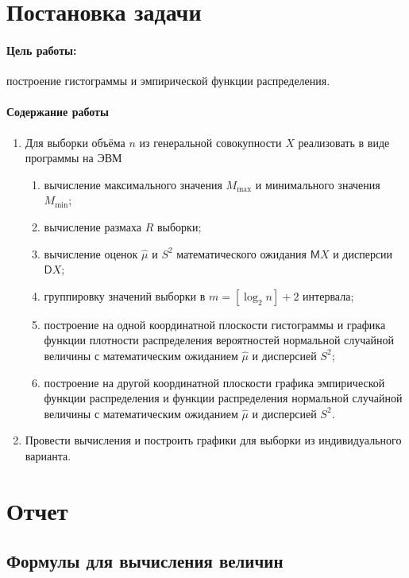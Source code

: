 \documentclass[a4paper, 12pt]{article}
\theoremstyle{definition}
\newcommand{\Expect}{%
	\mathsf{M}}
\renewcommand{\Variance}{%
	\mathsf{D}}
\begin{document}
\section{Постановка задачи}

\paragraph{Цель работы:} построение гистограммы и эмпирической функции распределения.

\paragraph{Содержание работы}

\begin{enumerate}
	\item Для выборки объёма $n$ из генеральной совокупности $X$ реализовать в виде программы на ЭВМ
	\begin{enumerate}
		\item вычисление максимального значения $M_{\max}$ и минимального значения $M_{\min}$;
		\item вычисление размаха $R$ выборки;
		\item вычисление оценок $\hat{\mu}$ и $S^2$ математического ожидания $\Expect X$ и дисперсии $\Variance X$;
		\item группировку значений выборки в $m = [\log_2 n] + 2$ интервала;
		\item построение на одной координатной плоскости гистограммы и графика функции плотности распределения вероятностей нормальной случайной величины с математическим ожиданием $\hat{\mu}$ и дисперсией $S^2$;
		\item построение на другой координатной плоскости графика эмпирической функции распределения и функции распределения нормальной случайной величины с математическим ожиданием $\hat{\mu}$ и дисперсией $S^2$.
	\end{enumerate}
	\item Провести вычисления и построить графики для выборки из индивидуального варианта.
\end{enumerate}
\newpage
\section{Отчет}

\subsection{Формулы для вычисления величин}
\end{document}
